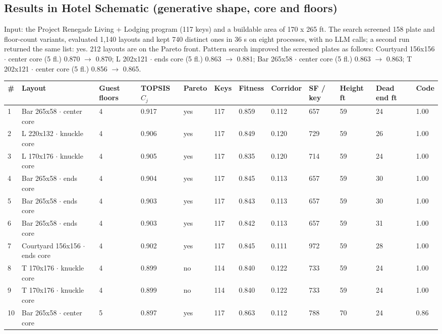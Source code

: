\subsection{Results in Hotel Schematic (generative shape, core and floors)}\label{sec:opthotel}
Input: the Project Renegade Living + Lodging program (117 keys) and a buildable area of
170 x 265 ft. The search screened 158 plate and floor-count variants,
evaluated 1,140 layouts and kept 740 distinct ones in 36 s on eight
processes, with no LLM calls; a second run returned the same list: yes.
212 layouts are on the Pareto front. Pattern search improved the screened plates as follows:
Courtyard 156x156 $\cdot$ center core (5 fl.) 0.870 $\to$ 0.870; L 202x121 $\cdot$ ends core (5 fl.) 0.863 $\to$ 0.881; Bar 265x58 $\cdot$ center core (5 fl.) 0.863 $\to$ 0.863; T 202x121 $\cdot$ center core (5 fl.) 0.856 $\to$ 0.865.
\begingroup{}\endgroup
{\footnotesize\begin{longtable}{p{0.38cm}p{3.99cm}p{0.95cm}p{1.14cm}p{0.85cm}p{0.76cm}p{0.95cm}p{1.04cm}p{0.85cm}p{0.85cm}p{0.95cm}p{0.76cm}}
\toprule
\textbf{\#} & \textbf{Layout} & \textbf{Guest floors} & \textbf{TOPSIS $C_j$} & \textbf{Pareto} & \textbf{Keys} & \textbf{Fitness} & \textbf{Corridor} & \textbf{SF / key} & \textbf{Height ft} & \textbf{Dead end ft} & \textbf{Code} \\ \midrule \endhead
1 & Bar 265x58 $\cdot$ center core & 4 & 0.917 & yes & 117 & 0.859 & 0.112 & 657 & 59 & 24 & 1.00 \\
2 & L 220x132 $\cdot$ knuckle core & 4 & 0.906 & yes & 117 & 0.849 & 0.120 & 729 & 59 & 26 & 1.00 \\
3 & L 170x176 $\cdot$ knuckle core & 4 & 0.905 & yes & 117 & 0.835 & 0.120 & 714 & 59 & 24 & 1.00 \\
4 & Bar 265x58 $\cdot$ ends core & 4 & 0.904 & yes & 117 & 0.845 & 0.113 & 657 & 59 & 30 & 1.00 \\
5 & Bar 265x58 $\cdot$ ends core & 4 & 0.903 & yes & 117 & 0.843 & 0.113 & 657 & 59 & 30 & 1.00 \\
6 & Bar 265x58 $\cdot$ ends core & 4 & 0.903 & yes & 117 & 0.842 & 0.113 & 657 & 59 & 31 & 1.00 \\
7 & Courtyard 156x156 $\cdot$ ends core & 4 & 0.902 & yes & 117 & 0.845 & 0.111 & 972 & 59 & 28 & 1.00 \\
8 & T 170x176 $\cdot$ knuckle core & 4 & 0.899 & no & 114 & 0.840 & 0.122 & 733 & 59 & 24 & 1.00 \\
9 & T 170x176 $\cdot$ knuckle core & 4 & 0.899 & no & 114 & 0.840 & 0.122 & 733 & 59 & 24 & 1.00 \\
10 & Bar 265x58 $\cdot$ center core & 5 & 0.897 & yes & 117 & 0.863 & 0.112 & 788 & 70 & 24 & 0.86 \\
\bottomrule
\end{longtable}}\addtocounter{table}{-1}
